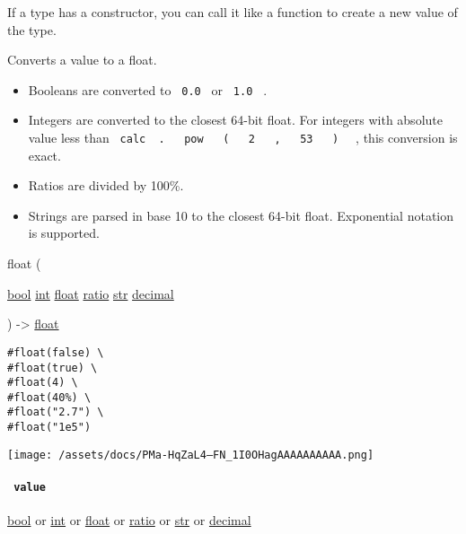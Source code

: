 \label{constructor-constructor-tooltip}
If a type has a constructor, you can call it like a function to create a
new value of the type.

Converts a value to a float.

\begin{itemize}
\tightlist
\item
  Booleans are converted to \texttt{\ 0.0\ } or \texttt{\ 1.0\ } .
\item
  Integers are converted to the closest 64-bit float. For integers with
  absolute value less than
  \texttt{\ calc\ }{\texttt{\ .\ }}\texttt{\ }{\texttt{\ pow\ }}\texttt{\ }{\texttt{\ (\ }}\texttt{\ }{\texttt{\ 2\ }}\texttt{\ }{\texttt{\ ,\ }}\texttt{\ }{\texttt{\ 53\ }}\texttt{\ }{\texttt{\ )\ }}\texttt{\ }
  , this conversion is exact.
\item
  Ratios are divided by 100\%.
\item
  Strings are parsed in base 10 to the closest 64-bit float. Exponential
  notation is supported.
\end{itemize}

{ float } (

{ \href{/docs/reference/foundations/bool/}{bool}
\href{/docs/reference/foundations/int/}{int}
\href{/docs/reference/foundations/float/}{float}
\href{/docs/reference/layout/ratio/}{ratio}
\href{/docs/reference/foundations/str/}{str}
\href{/docs/reference/foundations/decimal/}{decimal} }

) -\textgreater{} \href{/docs/reference/foundations/float/}{float}

\begin{verbatim}
#float(false) \
#float(true) \
#float(4) \
#float(40%) \
#float("2.7") \
#float("1e5")
\end{verbatim}

\texttt{[image: /assets/docs/PMa-HqZaL4--FN\_1I0OHagAAAAAAAAAA.png]}

\paragraph{\texorpdfstring{\texttt{\ value\ }}{ value }}\label{constructor-value}

\href{/docs/reference/foundations/bool/}{bool} {or}
\href{/docs/reference/foundations/int/}{int} {or}
\href{/docs/reference/foundations/float/}{float} {or}
\href{/docs/reference/layout/ratio/}{ratio} {or}
\href{/docs/reference/foundations/str/}{str} {or}
\href{/docs/reference/foundations/decimal/}{decimal}

